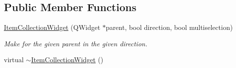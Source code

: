 \subsection*{Public Member Functions}
\begin{DoxyCompactItemize}
\item 
\hyperlink{class_u_i_1_1_item_collection_widget_a5b276818bbf26e3d5ee5871802c6105d}{Item\-Collection\-Widget} (Q\-Widget $\ast$parent, bool direction, bool multiselection)
\begin{DoxyCompactList}\small\item\em Make for the given parent in the given direction. \end{DoxyCompactList}\item 
\hypertarget{class_u_i_1_1_item_collection_widget_a9999255365a2c9f8560edd28ab6207bb}{virtual \hyperlink{class_u_i_1_1_item_collection_widget_a9999255365a2c9f8560edd28ab6207bb}{$\sim$\-Item\-Collection\-Widget} ()}\label{class_u_i_1_1_item_collection_widget_a9999255365a2c9f8560edd28ab6207bb}


\end{DoxyCompactItemize}
